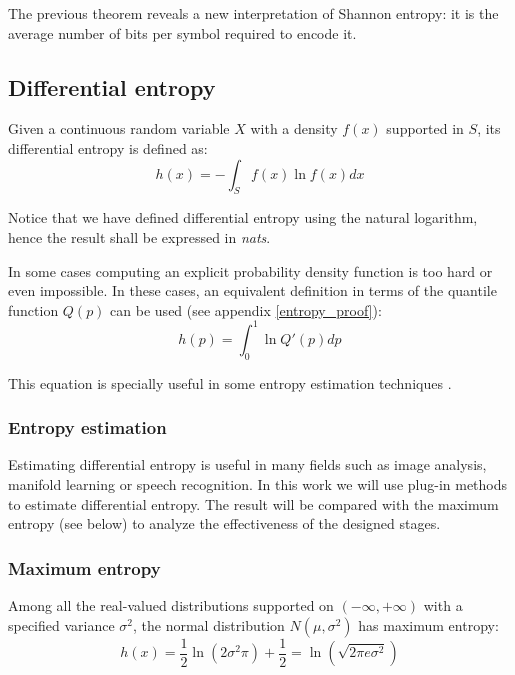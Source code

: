 The previous theorem reveals a new interpretation of Shannon entropy: it is the average number of bits per symbol required to encode it.

\subsection{Differential entropy}
Given a continuous random variable $X$ with a density $f(x)$ supported in $S$, its differential entropy is defined as:
\begin{equation} \label{eq:differential_entropy}
h(x) = - \int_{S}^{} f(x) \ln f(x) dx
\end{equation}

Notice that we have defined differential entropy using the natural logarithm, hence the result shall be expressed in \textit{nats}.

In some cases computing an explicit probability density function is too hard or even impossible. In these cases, an equivalent definition in terms of the quantile function $Q(p)$ can be used (see appendix \ref{entropy_proof}):
\begin{equation} \label{eq:differential_entropy_q}
h(p) = \int_{0}^{1} \ln Q'(p) dp
\end{equation}

This equation is specially useful in some entropy estimation techniques \parencite{Vasicek}.

\subsubsection{Entropy estimation}
Estimating differential entropy is useful in many fields such as image analysis, manifold learning or speech recognition. In this work we will use plug-in methods \parencite{EntropyEstimation} to estimate differential entropy. The result will be compared with the maximum entropy (see below) to analyze the effectiveness of the designed stages.

\subsubsection{Maximum entropy}
Among all the real-valued distributions supported on $(-\infty, +\infty)$ with a specified variance $\sigma^2$, the normal distribution $N(\mu, \sigma^2)$ has maximum entropy:
\begin{equation}
h(x) = \frac{1}{2} \ln \left(2\sigma^2\pi\right) + \frac{1}{2} = \ln\left(\sqrt{2\pi e \sigma^2}\right)
\end{equation}

